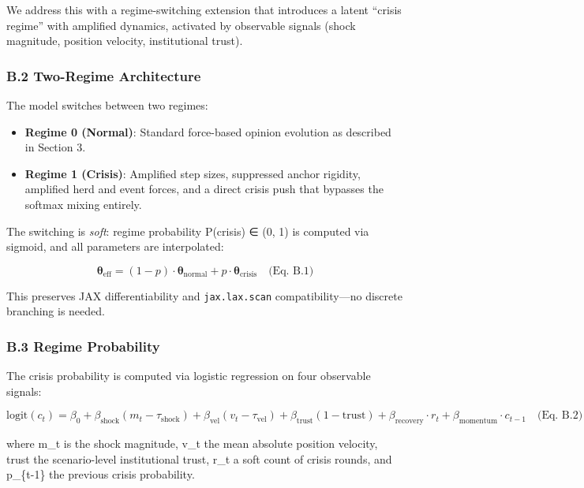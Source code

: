 \documentclass[
]{article}
\providecommand{\tightlist}{%
  \setlength{\itemsep}{0pt}\setlength{\parskip}{0pt}}
\begin{document}
We address this with a regime-switching extension that introduces a
latent ``crisis regime'' with amplified dynamics, activated by
observable signals (shock magnitude, position velocity, institutional
trust).

\subsubsection{B.2 Two-Regime
Architecture}\label{b.2-two-regime-architecture}

The model switches between two regimes:

\begin{itemize}
\tightlist
\item
  \textbf{Regime 0 (Normal)}: Standard force-based opinion evolution as
  described in Section 3.
\item
  \textbf{Regime 1 (Crisis)}: Amplified step sizes, suppressed anchor
  rigidity, amplified herd and event forces, and a direct crisis push
  that bypasses the softmax mixing entirely.
\end{itemize}

The switching is \emph{soft}: regime probability P(crisis) ∈ (0, 1) is
computed via sigmoid, and all parameters are interpolated:

\[\boldsymbol{\theta}_{\text{eff}} = (1 - p) \cdot \boldsymbol{\theta}_{\text{normal}} + p \cdot \boldsymbol{\theta}_{\text{crisis}} \quad \text{(Eq. B.1)}\]

This preserves JAX differentiability and \texttt{jax.lax.scan}
compatibility---no discrete branching is needed.

\subsubsection{B.3 Regime Probability}\label{b.3-regime-probability}

The crisis probability is computed via logistic regression on four
observable signals:

\[\text{logit}(c_t) = \beta_0 + \beta_{\text{shock}} (m_t - \tau_{\text{shock}}) + \beta_{\text{vel}} (v_t - \tau_{\text{vel}}) + \beta_{\text{trust}} (1 - \text{trust}) + \beta_{\text{recovery}} \cdot r_t + \beta_{\text{momentum}} \cdot c_{t-1} \quad \text{(Eq. B.2)}\]

where m\_t is the shock magnitude, v\_t the mean absolute position
velocity, trust the scenario-level institutional trust, r\_t a soft
count of crisis rounds, and p\_\{t-1\} the previous crisis probability.
\end{document}
